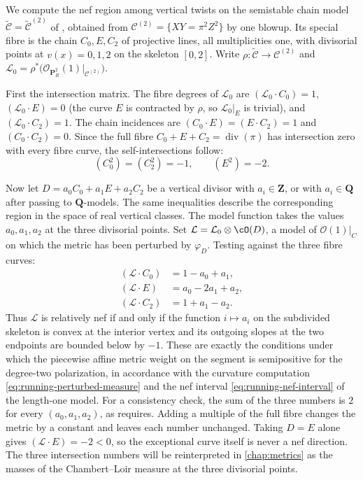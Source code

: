 \begin{example}
\label{ex:chain-nef-functions}
We compute the nef region among vertical twists on the semistable chain
model $\widetilde{\mathcal C}=\widetilde{\mathcal C}^{(2)}$ of
, obtained from
$\mathcal C^{(2)}=\{XY=\pi^2Z^2\}$ by one blowup.  Its special fibre is the
chain $C_0,E,C_2$ of projective lines, all multiplicities one, with
divisorial points at $v(x)=0,1,2$ on the skeleton $[0,2]$.  Write
$\rho:\widetilde{\mathcal C}\to\mathcal C^{(2)}$ and
$\mathcal L_0=\rho^*\bigl(\mathcal O_{\mathbf P^2_R}(1)|_{\mathcal
C^{(2)}}\bigr)$.

First the intersection matrix.  The fibre degrees of $\mathcal L_0$ are
$(\mathcal L_0\cdot C_0)=1$, $(\mathcal L_0\cdot E)=0$
(the curve $E$ is contracted by $\rho$, so $\mathcal L_0|_E$ is trivial),
and $(\mathcal L_0\cdot C_2)=1$.  The chain incidences are
$(C_0\cdot E)=(E\cdot C_2)=1$ and $(C_0\cdot C_2)=0$.  Since the full
fibre $C_0+E+C_2=\operatorname{div}(\pi)$ has intersection zero with every
fibre curve, the self-intersections follow:
\[
   (C_0^2)=(C_2^2)=-1,\qquad (E^2)=-2 .
\]

Now let $D=a_0C_0+a_1E+a_2C_2$ be a vertical divisor with $a_i\in\mathbf Z$,
or with $a_i\in\mathbf Q$ after passing to $\mathbf Q$-models. The same
inequalities describe the corresponding region in the space of real
vertical classes. The model function takes the values $a_0,a_1,a_2$ at the
three divisorial points. Set
$\mathcal L=\mathcal L_0\otimes\cO(D)$, a model of $\mathcal O(1)|_C$ on
which the metric has been perturbed by $\varphi_D$.  Testing against the
three fibre curves:
\[
 \begin{aligned}
 (\mathcal L\cdot C_0)&=1-a_0+a_1,\\
 (\mathcal L\cdot E)&=a_0-2a_1+a_2,\\
 (\mathcal L\cdot C_2)&=1+a_1-a_2 .
 \end{aligned}
\]
Thus $\mathcal L$ is relatively nef if and only if the function
$i\mapsto a_i$ on the subdivided skeleton is convex at the interior vertex
and its outgoing slopes at the two endpoints are bounded below by $-1$.
These are exactly the conditions under which the piecewise affine metric
weight on the segment is semipositive for the degree-two polarization, in
accordance with the curvature computation
\eqref{eq:running-perturbed-measure} and the nef interval
\eqref{eq:running-nef-interval} of the length-one model. For a consistency
check, the sum of the three numbers is
$2$ for every $(a_0,a_1,a_2)$, as
requires. Adding a multiple of the full fibre changes the metric by a
constant and leaves each number unchanged. Taking $D=E$ alone gives
$(\mathcal L\cdot E)=-2<0$, so the exceptional curve itself is never a nef
direction.  The three intersection numbers will be reinterpreted in
\cref{chap:metrics} as the masses of the Chambert--Loir measure at the
three divisorial points.
\end{example}


